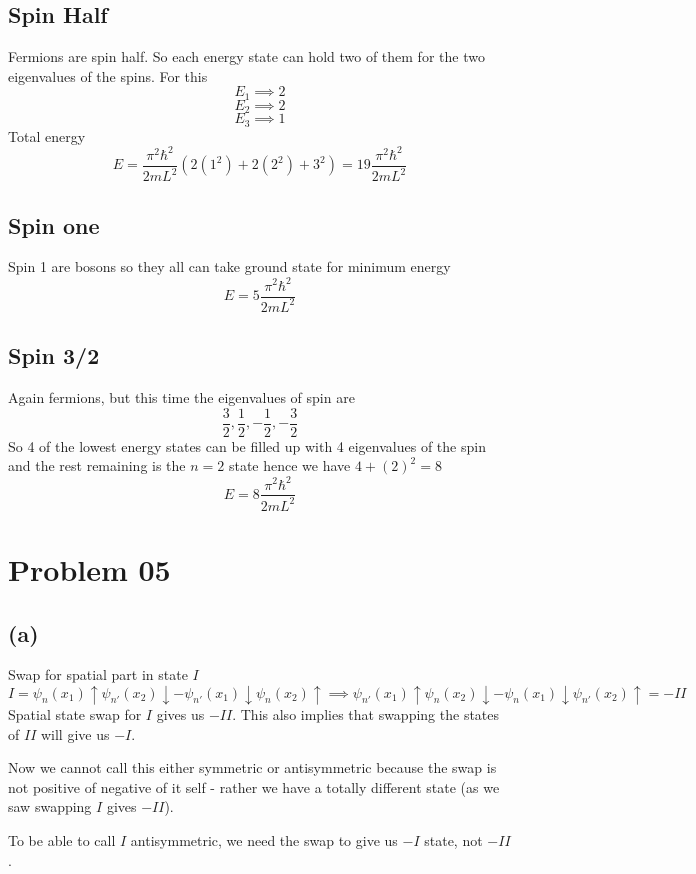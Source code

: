 \documentclass[a4paper]{article}
\newcommand{\hb}{\hbar}
\begin{document}
\subsection*{Spin Half} 
Fermions are spin half. So each energy state can hold two of them for the two eigenvalues of the spins. For this 
\[
E_1 \implies 2 \] \[ 
E_2 \implies 2 \] \[
E_3 \implies 1
\]
Total energy 
\[
E = \frac{\pi^2 \hb^2}{2 m L^2} (2(1^2) + 2(2^2 ) + 3^2) = \boxed{
19 \frac{\pi ^2 \hb ^2}{2 m L ^2}
}
\] 

\subsection*{Spin one} 
Spin 1 are bosons so they all can take ground state for minimum energy
\[
\boxed{
E = 5 \frac{\pi^2 \hb^2}{2 m L^2}
}\] 



\subsection*{Spin 3/2}
Again fermions, but this time the eigenvalues of spin are 
\[
\frac{3}{2} , \frac{1}{2}, - \frac{1}{2}, - \frac{3}{2}
\] 
So 4 of the lowest energy states can be filled up with 4 eigenvalues of the spin and the rest remaining is the $n = 2$ state hence we have $4 + (2)^2 = 8$ 
\[\boxed{
E = 8 \frac{\pi^2 \hb^2}{2 m L^2}
} \] 




\section*{Problem 05}
\subsection*{(a)}
Swap for spatial part in state $I$ 
\[
	I = \psi_n(x_1) \uparrow  \psi_{n'} (x_2) \downarrow 
	- 
	\psi_{n'}(x_1) \downarrow \psi_n (x_2) \uparrow 
	\implies 
	\psi_{n'}(x_1) \uparrow  \psi_{n} (x_2) \downarrow 
	- 
	\psi_{n}(x_1) \downarrow \psi_{n'} (x_2) \uparrow = - I I 
\]
Spatial state swap for $I$ gives us $- I I $. This also implies that swapping the states of $I I $ will give us $- I$. 

Now we cannot call this either symmetric or antisymmetric because the swap is not positive of negative of it self - rather we have a totally different state (as we saw swapping $I$ gives $ - I I $).

To be able to call $I$ antisymmetric, we need the swap to give us $- I $ state, not $- I I$.
\end{document}
